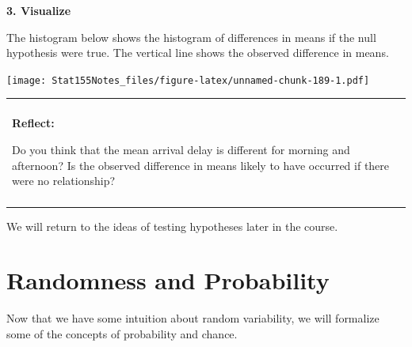 \documentclass[]{book}
\newenvironment{Shaded}{\begin{snugshade}}{\end{snugshade}}
\newcommand{\DataTypeTok}[1]{\textcolor[rgb]{0.13,0.29,0.53}{#1}}
\newcommand{\KeywordTok}[1]{\textcolor[rgb]{0.13,0.29,0.53}{\textbf{#1}}}
\newcommand{\NormalTok}[1]{#1}
\newcommand{\OperatorTok}[1]{\textcolor[rgb]{0.81,0.36,0.00}{\textbf{#1}}}
\newcommand{\StringTok}[1]{\textcolor[rgb]{0.31,0.60,0.02}{#1}}
\newenvironment{reflect}
{
    \begin{center}
    
    \begin{tabular}{|p{0.8\textwidth}|}
    \rowcolor{LightBlue}
    \hline\\
    \rowcolor{LightBlue}
    \textbf{Reflect:}
}
{
    \\\rowcolor{LightBlue}
    \\\hline
    \end{tabular} 
    \end{center}
}
\begin{document}
\textbf{3. Visualize}

The histogram below shows the histogram of differences in means if the null hypothesis were true. The vertical line shows the observed difference in means.

\begin{Shaded}
\end{Shaded}

\texttt{[image: Stat155Notes\_files/figure-latex/unnamed-chunk-189-1.pdf]}

\begin{reflect}
Do you think that the mean arrival delay is different for morning and
afternoon? Is the observed difference in means likely to have occurred
if there were no relationship?
\end{reflect}

We will return to the ideas of testing hypotheses later in the course.

\hypertarget{randomness-and-probability}{%
\chapter{Randomness and Probability}\label{randomness-and-probability}}

Now that we have some intuition about random variability, we will formalize some of the concepts of probability and chance.
\end{document}
